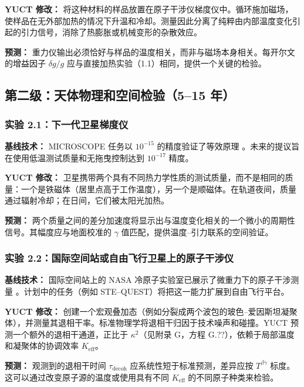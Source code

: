 \documentclass[12pt]{article}
\theoremstyle{remark}
\newcommand{\Keff}{K_{\mathrm{eff}}}
\begin{document}
	\textbf{YUCT 修改：} 将这种材料的样品放置在原子干涉仪梯度仪中。循环施加磁场，使样品在无外部加热的情况下升温和冷却。测量因此分离了纯粹由内部温度变化引起的引力信号，消除了热膨胀或机械变形的杂散效应。
	
	\textbf{预测：} 重力仪输出必须恰好与样品的温度相关，而非与磁场本身相关。每开尔文的增益因子 $\delta g/g$ 应与直接加热实验（1.1）相同，提供一个关键的检验。
	
	\subsection{第二级：天体物理和空间检验（5–15 年）}
	\label{subsec:space-tests}
	
	\subsubsection{实验 2.1：下一代卫星梯度仪}
	
	\textbf{基线技术：} MICROSCOPE 任务以 $10^{-15}$ 的精度验证了等效原理 \cite{Touboul2022}。未来的提议旨在使用低温测试质量和无拖曳控制达到 $10^{-17}$ 精度。
	
	\textbf{YUCT 修改：} 卫星携带两个具有不同热力学性质的测试质量，而不是相同的质量：一个是铁磁体（居里点高于工作温度），另一个是顺磁体。在轨道夜间，质量通过辐射冷却；在日间，它们被太阳光加热。
	
	\textbf{预测：} 两个质量之间的差分加速度将显示出与温度变化相关的一个微小的周期性信号。其幅度应与地面校准的 $\gamma$ 值匹配，提供温度–引力联系的空间验证。
	
	\subsubsection{实验 2.2：国际空间站或自由飞行卫星上的原子干涉仪}
	
	\textbf{基线技术：} 国际空间站上的 NASA 冷原子实验室已展示了微重力下的原子干涉测量 \cite{Aveline2020}。计划中的任务（例如 STE–QUEST）将把这一能力扩展到自由飞行平台。
	
	\textbf{YUCT 修改：} 创建一个宏观叠加态（例如分裂成两个波包的玻色–爱因斯坦凝聚体），并测量其退相干率。标准物理学将退相干归因于技术噪声和碰撞。YUCT 预测一个额外的退相干通道，正比于 $\kappa^2$（见附录 G，方程 G.??），依赖于局部温度和凝聚体的协调效率 $\Keff$。
	
	\textbf{预测：} 观测到的退相干时间 $\tau_{\mathrm{decoh}}$ 应系统性短于标准预测，差异应按 $T^{\beta\gamma}$ 标度。这可以通过改变原子源的温度或使用具有不同 $\Keff$ 的不同原子种类来检验。
	
\end{document}
